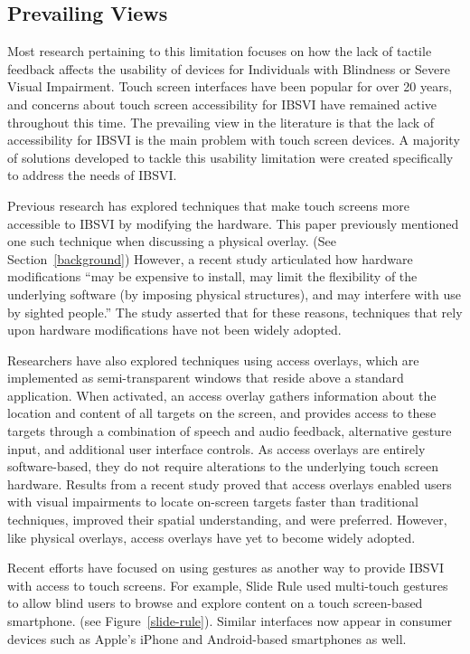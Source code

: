 \documentclass[11pt]{article}
\begin{document}
\subsection{Prevailing Views}
Most research pertaining to this limitation focuses on how the lack of tactile feedback affects the usability of devices for Individuals with Blindness or Severe Visual Impairment. Touch screen interfaces have been popular for over 20 years, and concerns about touch screen accessibility for IBSVI have remained active throughout this time. \cite{Buxton:1986:HID:22339.22386} The prevailing view in the literature is that the lack of accessibility for IBSVI is the main problem with touch screen devices.  A majority of solutions developed to tackle this usability limitation were created specifically to address the needs of IBSVI.

Previous research has explored techniques that make touch screens more accessible to IBSVI by modifying the hardware. This paper previously mentioned one such technique when discussing a physical overlay. (See Section~\ref{background}) However, a recent study articulated how hardware modifications ``may be expensive to install, may limit the flexibility of the underlying software (by imposing physical structures), and may interfere with use by sighted people.'' \cite{Kane:2011:AOI:2047196.2047232}  The study asserted that for these reasons, techniques that rely upon hardware modifications have not been widely adopted.

Researchers have also explored techniques using access overlays, which are implemented as semi-transparent windows that reside above a standard application. When activated, an access overlay gathers information about the location and content of all targets on the screen, and provides access to these targets through a combination of speech and audio feedback, alternative gesture input, and additional user interface controls. As access overlays are entirely software-based, they do not require alterations to the underlying touch screen hardware. Results from a recent study proved that access overlays enabled users with visual impairments to locate on-screen targets faster than traditional techniques, improved their spatial understanding, and were preferred.\cite{Kane:2011:AOI:2047196.2047232} However,  like physical overlays, access overlays have yet to become widely adopted.

Recent efforts have focused on using gestures as another way to provide IBSVI with access to touch screens. For example, Slide Rule \cite{Kane:2008:SRM:1414471.1414487} used multi-touch gestures to allow blind users to browse and explore content on a touch screen-based smartphone. (see Figure~\ref{slide-rule}). Similar interfaces now appear in consumer devices such as Apple's iPhone\cite{AppleMultiTouch} and Android-based smartphones \cite{AndroidMultiTouch} as well.
\end{document}
